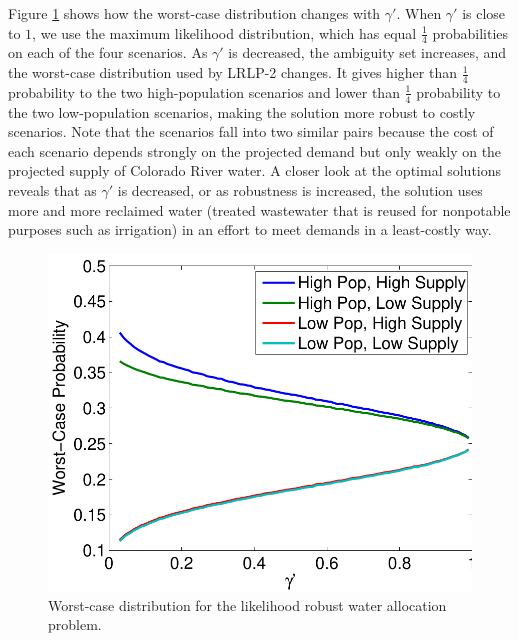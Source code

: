 \documentclass[11pt]{article}
\begin{document}
Figure \ref{fig:worst_case} shows how the worst-case distribution changes with $\gamma'$.
When $\gamma'$ is close to $1$, we use the maximum likelihood distribution, which has equal $\tfrac{1}{4}$ probabilities on each of the four scenarios.
As $\gamma'$ is decreased, the ambiguity set increases, and the worst-case distribution used by LRLP-2 changes.
It gives higher than $\tfrac{1}{4}$ probability to the two high-population scenarios and lower than $\tfrac{1}{4}$ probability to the two low-population scenarios, making the solution more robust to costly scenarios.
Note that the scenarios fall into two similar pairs because the cost of each scenario depends strongly on the projected demand but only weakly on the projected supply of Colorado River water.
A closer look at the optimal solutions reveals that as $\gamma'$ is decreased, or as robustness is increased, the solution uses more and more reclaimed water (treated wastewater that is reused for nonpotable purposes such as irrigation) in an effort to meet demands in a least-costly way.

\begin{figure}
	\centering
	\includegraphics[width=.5\textwidth]{images/worst_case_probability}
	\caption{Worst-case distribution for the likelihood robust water allocation problem.}
	\label{fig:worst_case}
\end{figure}

\end{document}

